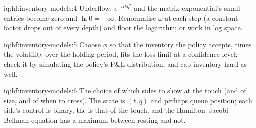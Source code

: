 \begin{solution}{iq:hf:inventory-models:4}
Underflow: $e^{-\alpha kq^2}$ and the matrix exponential's small entries become zero and $\ln0=-\infty$. Renormalise $\omega$ at each step (a
constant factor drops out of every depth) and floor the logarithm; or work in log space.
\end{solution}

\begin{solution}{iq:hf:inventory-models:5}
Choose $\phi$ so that the inventory the policy accepts, times the volatility over the holding period, fits the loss limit at a confidence level; check
it by simulating the policy's P\&L distribution, and cap inventory hard as well.
\end{solution}

\begin{solution}{iq:hf:inventory-models:6}
The choice of which sides to show at the touch (and of size, and of when to cross). The state is $(t,q)$ and perhaps queue position; each side's
control is binary, the  is that of the touch, and the Hamilton--Jacobi--Bellman equation has a maximum between resting and not.
\end{solution}
